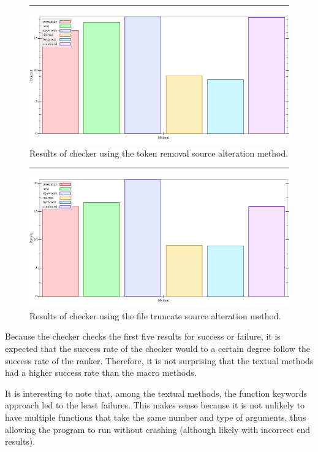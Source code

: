 \documentclass[ms,electronic,twosidetoc,letterpaper,chaptercenter,parttop,lol,lof,lot]{byumsphd}
\begin{document}
\begin{figure}[h]
\centering
\hrule
\includegraphics[width=1.0\textwidth]{../output/synthesis/checker/Remove-Percent.png}
\caption{Results of checker using the token removal source alteration method.}
\label{checker-remove-percent}
\end{figure}

\begin{figure}[h]
\centering
\hrule
\includegraphics[width=1.0\textwidth]{../output/synthesis/checker/Truncate-Percent.png}
\caption{Results of checker using the file truncate source alteration method.}
\label{checker-truncate-percent}
\end{figure}

Because the checker checks the first five results for success or failure, it is expected
that the success rate of the checker would to a certain degree follow the success rate of
the ranker. Therefore, it is not surprising that the textual methods had a higher success
rate than the macro methods.

It is interesting to note that, among the textual methods, the function keywords approach
led to the least failures. This makes sense because it is not unlikely to have multiple
functions that take the same number and type of arguments, thus allowing the program to
run without crashing (although likely with incorrect end results).
\end{document}
